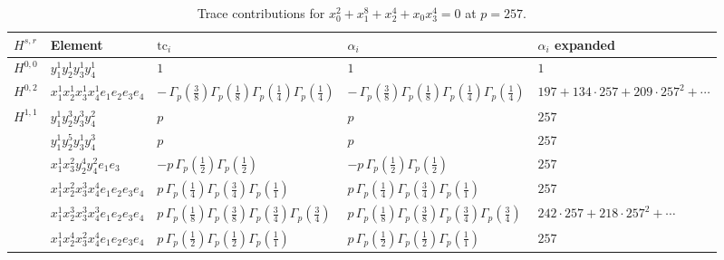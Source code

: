\documentclass[11pt]{article}
\begin{document}
\begin{table}[ht]
\centering
\caption{Trace contributions for $x_0^{2} + x_1^{8} + x_2^{4} + x_0 x_3^{4} = 0$ at $p=257$.}\label{tab:deformed-11}
\renewcommand{\arraystretch}{1.1}
{\scriptsize
\begin{tabular}{@{}lllll@{}}
\toprule
$H^{s,r}$ & Element & $\mathrm{tc}_i$ & $\alpha_i$ & $\alpha_i$ expanded \\
\midrule
$H^{0,0}$ & $y_{1}^{1} y_{2}^{1} y_{3}^{1} y_{4}^{1}$ & $1$ & $1$ & $1$ \\
\midrule
$H^{0,2}$ & $x_{1}^{1} x_{2}^{1} x_{3}^{1} x_{4}^{1}  e_{1} e_{2} e_{3} e_{4}$ & $- \, \Gamma_p \left( \frac{3}{8} \right) \Gamma_p \left( \frac{1}{8} \right) \Gamma_p \left( \frac{1}{4} \right) \Gamma_p \left( \frac{1}{4} \right)$ & $- \, \Gamma_p \left( \frac{3}{8} \right) \Gamma_p \left( \frac{1}{8} \right) \Gamma_p \left( \frac{1}{4} \right) \Gamma_p \left( \frac{1}{4} \right)$ & $197{+}134{\cdot}257{+}209{\cdot}257^{2}{+}\cdots$ \\
\midrule
$H^{1,1}$ & $y_{1}^{1} y_{2}^{3} y_{3}^{3} y_{4}^{2}$ & $p \,$ & $p \,$ & $257$ \\
 & $y_{1}^{1} y_{2}^{5} y_{3}^{1} y_{4}^{3}$ & $p \,$ & $p \,$ & $257$ \\
 & $x_{1}^{1} x_{3}^{2} y_{2}^{4} y_{4}^{2} e_{1} e_{3}$ & $- p \, \Gamma_p \left( \frac{1}{2} \right) \Gamma_p \left( \frac{1}{2} \right)$ & $- p \, \Gamma_p \left( \frac{1}{2} \right) \Gamma_p \left( \frac{1}{2} \right)$ & $257$ \\
 & $x_{1}^{1} x_{2}^{2} x_{3}^{3} x_{4}^{4}  e_{1} e_{2} e_{3} e_{4}$ & $p \, \Gamma_p \left( \frac{1}{4} \right) \Gamma_p \left( \frac{3}{4} \right) \Gamma_p \left( \frac{1}{1} \right)$ & $p \, \Gamma_p \left( \frac{1}{4} \right) \Gamma_p \left( \frac{3}{4} \right) \Gamma_p \left( \frac{1}{1} \right)$ & $257$ \\
 & $x_{1}^{1} x_{2}^{3} x_{3}^{3} x_{4}^{3}  e_{1} e_{2} e_{3} e_{4}$ & $p \, \Gamma_p \left( \frac{1}{8} \right) \Gamma_p \left( \frac{3}{8} \right) \Gamma_p \left( \frac{3}{4} \right) \Gamma_p \left( \frac{3}{4} \right)$ & $p \, \Gamma_p \left( \frac{1}{8} \right) \Gamma_p \left( \frac{3}{8} \right) \Gamma_p \left( \frac{3}{4} \right) \Gamma_p \left( \frac{3}{4} \right)$ & $242{\cdot}257{+}218{\cdot}257^{2}{+}\cdots$ \\
 & $x_{1}^{1} x_{2}^{4} x_{3}^{2} x_{4}^{4}  e_{1} e_{2} e_{3} e_{4}$ & $p \, \Gamma_p \left( \frac{1}{2} \right) \Gamma_p \left( \frac{1}{2} \right) \Gamma_p \left( \frac{1}{1} \right)$ & $p \, \Gamma_p \left( \frac{1}{2} \right) \Gamma_p \left( \frac{1}{2} \right) \Gamma_p \left( \frac{1}{1} \right)$ & $257$ \\

\end{tabular}}
\end{table}
\end{document}
